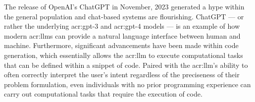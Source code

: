 \begin{comment}
Having a template to work from provides a starting point.
However, for a given project, a slight variation in the template may be required due to the nature of the given project.
Furthermore, the order in which the various chapters and sections will be written will also vary from project to project,
but the writing will seldom start at the abstract and sequentially follow the chapters of the report.
One critical reason for this is that you need to start writing as early as possible and that you will begin to write up where you are currently focusing.
However, do not leave working on the abstract until the very last days. The abstract is the first thing anyone reads of an article or thesis --- after the title;
and thus it is important that it is very well written. Abstracts are hard to write, so create revisions throughout the course of your project.

The background and motivation here should state where your project is situated in the field and what the key driving forces motivating this research are.
However, keep this section brief, as it is still part of the introduction.
The motivation will be further elaborated on in Chapter~\ref{cha:related_work}, presenting your complete state-of-the-art.

Note that this template uses italics to highlight where Latin wording is inserted to represent text and the text of the template
that we wish to draw your attention to. The italics themselves are not an indication that such sections should use italics.

\end{comment}

The release of OpenAI's ChatGPT in November, 2023 generated a hype within the general population and chat-based systems are flourishing. ChatGPT --- or rather the underlying \acrshort{acr:gpt}-3 and \acrshort{acr:gpt}-4 models --- is an example of how modern \glspl{acr:llm} can provide a natural language interface between human and machine. Furthermore, significant advancements have been made within code generation, which essentially allows the \gls{acr:llm} to execute computational tasks that can be defined within a snippet of code. Paired with the \gls{acr:llm}'s ability to often correctly interpret the user's intent regardless of the preciseness of their problem formulation, even individuals with no prior programming experience can carry out computational tasks that require the execution of code.

